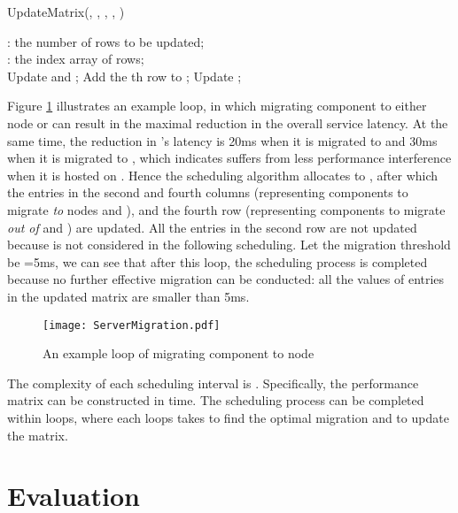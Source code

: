 \documentclass[10pt, conference, compsocconf]{IEEEtran}
\begin{document}
\begin{algorithm}[htbp]
\caption{UpdateMatrix(, , , , )}
\label{UpdatingFunction}
\begin{algorithmic}[1]
\REQUIRE : the number of rows to be updated;\\
: the index array of rows; \\
    \STATE Update  and ;
        \STATE Add the th row  to ;
    \ENDIF
\ENDFOR
{}
        \STATE Update ;
    \ENDFOR
\ENDFOR
\end{algorithmic}
\end{algorithm}

Figure \ref{Fig: ServerMigration} illustrates an example loop, in which migrating component  to either node  or  can result in the maximal reduction in the overall service latency. At the same time, the reduction in 's latency is 20ms when it is migrated to  and 30ms when it is migrated to , which indicates  suffers from less performance interference when it is hosted on . Hence the scheduling algorithm allocates  to , after which the entries in the second and fourth columns (representing components to migrate \emph{to} nodes  and ), and the fourth row (representing components to migrate \emph{out of}  and ) are updated. All the entries in the second row are not updated because  is not considered in the following scheduling. Let the migration threshold be =5ms, we can see that after this loop, the scheduling process is completed because no further effective migration can be conducted: all the values of entries in the updated matrix are smaller than 5ms.

\begin{figure}
\centering
  \texttt{[image: ServerMigration.pdf]}\\
  \caption{An example loop of migrating component  to node }
  \label{Fig: ServerMigration}
\end{figure}

The complexity of each scheduling interval is . Specifically, the performance matrix can be constructed in  time. The scheduling process can be completed within  loops, where each loops takes  to find the optimal migration and  to update the matrix.

\section{Evaluation}  \label{Section: Evaluation}
\end{document}
